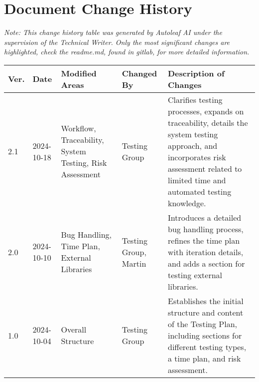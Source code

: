 \section{Document Change History}

\begin{center}
\small\textit{Note: This change history table was generated by Autoleaf AI under the supervision of the Technical Writer. Only the most significant changes are highlighted, check the readme.md, found in gitlab, for more detailed information.}

\vspace{0.5cm}

\begin{tabular}{|p{}|p{}|p{}|p{}|p{}|}
\hline
\textbf{Ver.} & \textbf{Date} & \textbf{Modified Areas} & \textbf{Changed By} & \textbf{Description of Changes} \\
\hline
2.1 & 2024-10-18 & Workflow, Traceability, System Testing, Risk Assessment & Testing Group & Clarifies testing processes, expands on traceability, details the system testing approach, and incorporates risk assessment related to limited time and automated testing knowledge. \\
\hline
2.0 & 2024-10-10 & Bug Handling, Time Plan, External Libraries & Testing Group, Martin & Introduces a detailed bug handling process, refines the time plan with iteration details, and adds a section for testing external libraries. \\
\hline
1.0 & 2024-10-04 & Overall Structure & Testing Group & Establishes the initial structure and content of the Testing Plan, including sections for different testing types, a time plan, and risk assessment. \\
\hline
\end{tabular}
\end{center}

\vspace{1cm} 

